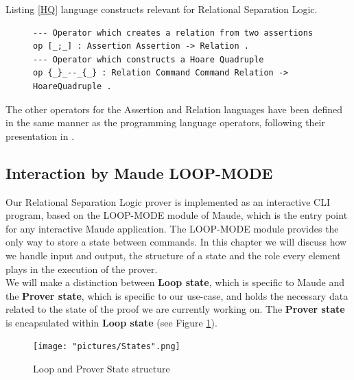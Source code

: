 \documentclass[12pt,a4paper]{article}
\begin{document}
{\begin{itemize}
	Listing \ref{HQ} language constructs relevant for Relational Separation Logic.
	\begin{figure}[h]
	\begin{lstlisting}[caption=Examples of Relational Separation Logic specific constructs,label=HQ]
--- Operator which creates a relation from two assertions
op [_;_] : Assertion Assertion -> Relation .
--- Operator which constructs a Hoare Quadruple 
op {_}_--_{_} : Relation Command Command Relation -> HoareQuadruple .\end{lstlisting}
	\end{figure}
\end{itemize}
The other operators for the Assertion and Relation languages have been defined in the same manner as the programming language operators, following their presentation in \cite{relational}.

\subsection{Interaction by Maude LOOP-MODE}
Our Relational Separation Logic prover is implemented as an interactive CLI program, based on the LOOP-MODE module of Maude, which is the entry point for any interactive Maude application. The LOOP-MODE module provides the only way to store a state between commands. In this chapter we will discuss how we handle input and output, the structure of a state and the role every element plays in the execution of the prover.\\

We will make a distinction between \textbf{Loop state}, which is specific to Maude and the \textbf{Prover state}, which is specific to our use-case, and holds the necessary data related to the state of the proof we are currently working on. The \textbf{Prover state} is encapsulated within \textbf{Loop state} (see Figure \ref{fig:states}).
\begin{figure}[h]
	\texttt{[image: "pictures/States".png]}
	\caption{Loop and Prover State structure}
	\label{fig:states}
\end{figure}
}
\end{document}
